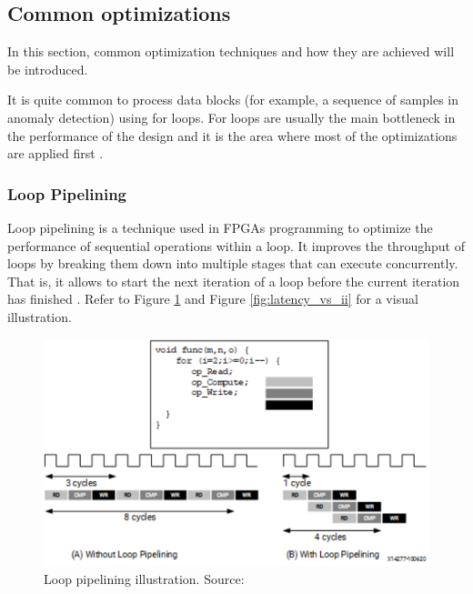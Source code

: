 \documentclass[a4paper, twoside]{report}
\theoremstyle{definition}
\numberwithin{equation}{section}
\begin{document}
\subsection{Common optimizations} \label{sec:common_optimizations}

In this section, common optimization techniques and how they are achieved will be introduced.

It is quite common to process data blocks
(for example, a sequence of samples in anomaly detection) using for loops.
For loops are usually the main bottleneck in the performance of the design
and it is the area where most of the optimizations are applied first \cite{AMD2023VitisHLS}.


\subsubsection{Loop Pipelining} \label{sec:loop_pipelining}

Loop pipelining is a technique used in FPGAs programming to optimize the performance of sequential operations within a loop.
It improves the throughput of loops by breaking them down into multiple stages
that can execute concurrently.
That is, it allows to start the next iteration of a loop before the current
iteration has finished \cite{AMD2023Pipelining}.
Refer to Figure \ref{fig:loop_pipelining} and Figure \ref{fig:latency_vs_ii} for a visual illustration.



\begin{figure}[h!]
    \centering
    \includegraphics[scale=0.7]{loop_pipelining.png}
    \caption{Loop pipelining illustration. Source: \cite{AMD2023Pipelining}}
    \label{fig:loop_pipelining}
\end{figure}
\end{document}
